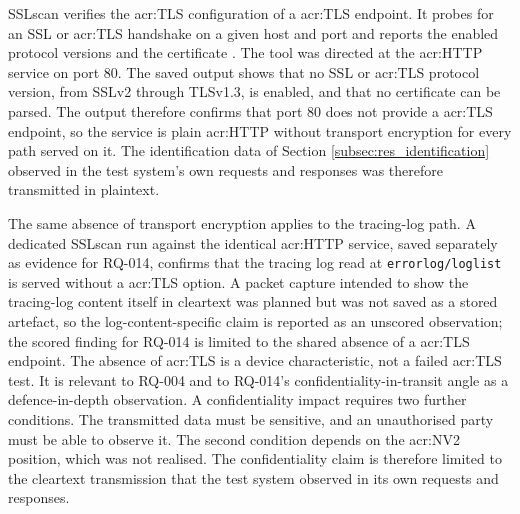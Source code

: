 SSLscan verifies the \gls{acr:TLS} configuration of a \gls{acr:TLS} endpoint. It probes for an SSL or \gls{acr:TLS} handshake on a given host and port and reports the enabled protocol versions and the certificate \Cite{rbsec-sslscan} \cite{kali_sslscan}. The tool was directed at the \gls{acr:HTTP} service on port 80. The saved output shows that no SSL or \gls{acr:TLS} protocol version, from SSLv2 through TLSv1.3, is enabled, and that no certificate can be parsed. The output therefore confirms that port 80 does not provide a \gls{acr:TLS} endpoint, so the service is plain \gls{acr:HTTP} without transport encryption for every path served on it. The identification data of Section \ref{subsec:res_identification} observed in the test system's own requests and responses was therefore transmitted in plaintext.

The same absence of transport encryption applies to the tracing-log path. A dedicated SSLscan run against the identical \gls{acr:HTTP} service, saved separately as evidence for RQ-014, confirms that the tracing log read at \texttt{errorlog/loglist} is served without a \gls{acr:TLS} option. A packet capture intended to show the tracing-log content itself in cleartext was planned but was not saved as a stored artefact, so the log-content-specific claim is reported as an unscored observation; the scored finding for RQ-014 is limited to the shared absence of a \gls{acr:TLS} endpoint.
The absence of \gls{acr:TLS} is a device characteristic, not a failed \gls{acr:TLS} test. It is relevant to RQ-004 and to RQ-014's confidentiality-in-transit angle as a defence-in-depth observation.
A confidentiality impact requires two further conditions. The transmitted data must be sensitive, and an unauthorised party must be able to observe it. The second condition depends on the \gls{acr:NV2} position, which was not realised. The confidentiality claim is therefore limited to the cleartext transmission that the test system observed in its own requests and responses.








